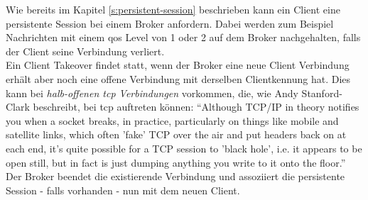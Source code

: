 \label{s:client-takeover}
Wie bereits im Kapitel \ref{s:persistent-session} beschrieben kann ein Client eine persistente Session bei einem Broker anfordern. Dabei werden zum Beispiel Nachrichten mit einem \ac{qos} Level von 1 oder 2 auf dem Broker nachgehalten, falls der Client seine Verbindung verliert.
\\
Ein Client Takeover findet statt, wenn der Broker eine neue Client Verbindung erhält aber noch eine offene Verbindung mit derselben Clientkennung hat. Dies kann bei \textit{halb-offenen \acs{tcp} Verbindungen} vorkommen, die, wie Andy Stanford-Clark beschreibt, bei \ac{tcp} auftreten können:\newline
``Although TCP/IP in theory notifies you when a socket breaks, in practice, particularly on things like mobile and satellite links, which often 'fake' TCP over the air and put headers back on at each end, it’s quite possible for a TCP session to 'black hole', i.e. it appears to be open still, but in fact is just dumping anything you write to it onto the floor.''\cite{WhyKeepaliveNeeded}\newline
Der Broker beendet die existierende Verbindung und assoziiert die persistente Session - falls vorhanden - nun mit dem neuen Client.
\cite{teamKeepAliveClient}
\newpage

